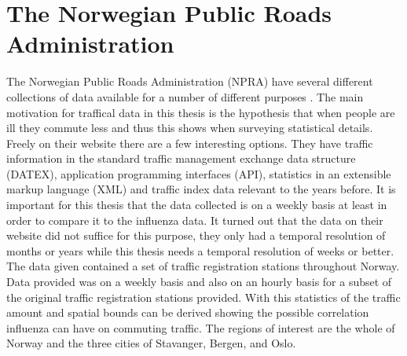 \section{The Norwegian Public Roads Administration}
The Norwegian Public Roads Administration (NPRA) have several different collections of data available for a number of different purposes \cite{vegvesenet}. The main motivation for traffical data in this thesis is the hypothesis that when people are ill they commute less and thus this shows when surveying statistical details. Freely on their website \cite{vegvesenet} there are a few interesting options. They have traffic information in the standard traffic management exchange data structure (DATEX), application programming interfaces (API), statistics in an extensible markup language (XML) and traffic index data relevant to the years before. It is important for this thesis that the data collected is on a weekly basis at least in order to compare it to the influenza data. It turned out that the data on their website did not suffice for this purpose, they only had a temporal resolution of months or years while this thesis needs a temporal resolution of weeks or better. The data given contained a set of traffic registration stations throughout Norway. Data provided was on a weekly basis and also on an hourly basis for a subset of the original traffic registration stations provided. With this statistics of the traffic amount and spatial bounds can be derived showing the possible correlation influenza can have on commuting traffic. The regions of interest are the whole of Norway and the three cities of Stavanger, Bergen, and Oslo.

